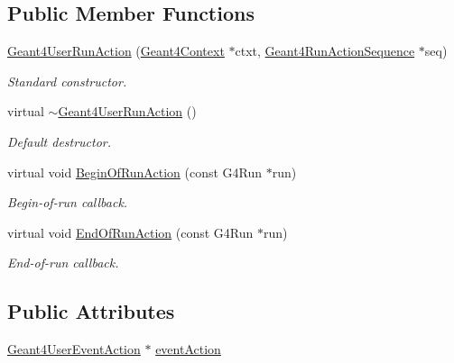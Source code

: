 \subsection*{Public Member Functions}
\begin{DoxyCompactItemize}
\item 
\hyperlink{class_d_d4hep_1_1_simulation_1_1_geant4_user_run_action_a4619583991588e3f0e3d51da6082bac3}{Geant4UserRunAction} (\hyperlink{class_d_d4hep_1_1_simulation_1_1_geant4_context}{Geant4Context} $\ast$ctxt, \hyperlink{class_d_d4hep_1_1_simulation_1_1_geant4_run_action_sequence}{Geant4RunActionSequence} $\ast$seq)
\begin{DoxyCompactList}\small\item\em Standard constructor. \item\end{DoxyCompactList}\item 
virtual \hyperlink{class_d_d4hep_1_1_simulation_1_1_geant4_user_run_action_a5b3bda44a46cc253d0c1d343d4f28738}{$\sim$Geant4UserRunAction} ()
\begin{DoxyCompactList}\small\item\em Default destructor. \item\end{DoxyCompactList}\item 
virtual void \hyperlink{class_d_d4hep_1_1_simulation_1_1_geant4_user_run_action_a42955d00dd5a101ec3e9594645eac6e5}{BeginOfRunAction} (const G4Run $\ast$run)
\begin{DoxyCompactList}\small\item\em Begin-\/of-\/run callback. \item\end{DoxyCompactList}\item 
virtual void \hyperlink{class_d_d4hep_1_1_simulation_1_1_geant4_user_run_action_acb9977f8d385a4f6523617dafea602bb}{EndOfRunAction} (const G4Run $\ast$run)
\begin{DoxyCompactList}\small\item\em End-\/of-\/run callback. \item\end{DoxyCompactList}\end{DoxyCompactItemize}
\subsection*{Public Attributes}
\begin{DoxyCompactItemize}
\item 
\hyperlink{class_d_d4hep_1_1_simulation_1_1_geant4_user_event_action}{Geant4UserEventAction} $\ast$ \hyperlink{class_d_d4hep_1_1_simulation_1_1_geant4_user_run_action_a6726ebc3d952df848fc4e8288d3bb6c0}{eventAction}
\end{DoxyCompactItemize}



